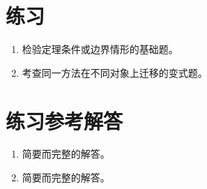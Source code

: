 \documentclass[11pt,a4paper,fontset=fandol]{ctexart}
\theoremstyle{definition}
\theoremstyle{plain}
\theoremstyle{remark}
\begin{document}
\section{练习}

\begin{enumerate}
  \item 检验定理条件或边界情形的基础题。
  \item 考查同一方法在不同对象上迁移的变式题。
\end{enumerate}

\appendix
\section{练习参考解答}

\begin{enumerate}
  \item 简要而完整的解答。
  \item 简要而完整的解答。
\end{enumerate}
\end{document}
